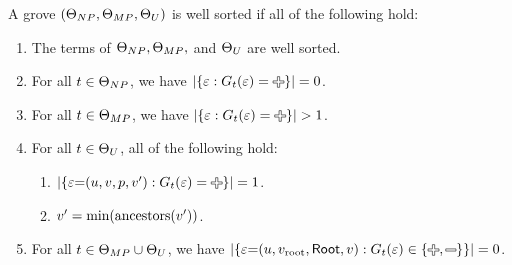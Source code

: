 \begin{definition}
  A grove $(\Set[NP], \Set[MP], \Set[U])$ is well sorted if all of the following hold:
  \begin{enumerate}
    \item The terms of $\Set[NP], \Set[MP],$ and $\Set[U]$ are well sorted.
    \item For all $t \in \Set[NP]$,
      we have $\SizeOf{\SetOf{\e \SuchThat{G_t(\e) = \Plus}}} = 0$.
    \item For all $t \in \Set[MP]$,
      we have $\SizeOf{\SetOf{\e \SuchThat{G_t(\e) = \Plus}}} > 1$.
    \item For all $t \in \Set[U]$, all of the following hold:
      \begin{enumerate}
        \item $\SizeOf{\SetOf{\e{=}(u, v, p, v') \SuchThat{G_t(\e) = \Plus}}} = 1$.
        \item $v' = \min{\ancestors{v'}}$.
      \end{enumerate}
    \item For all $t \in \Set[MP] \cup \Set[U]$,
      we have $\SizeOf{\SetOf{\e{=}(u, \rootVertex, \Root, v) \SuchThat{G_t(\e) \in \SetOf{\Plus, \Minus}}}} = 0$.
  \end{enumerate}
\end{definition}

